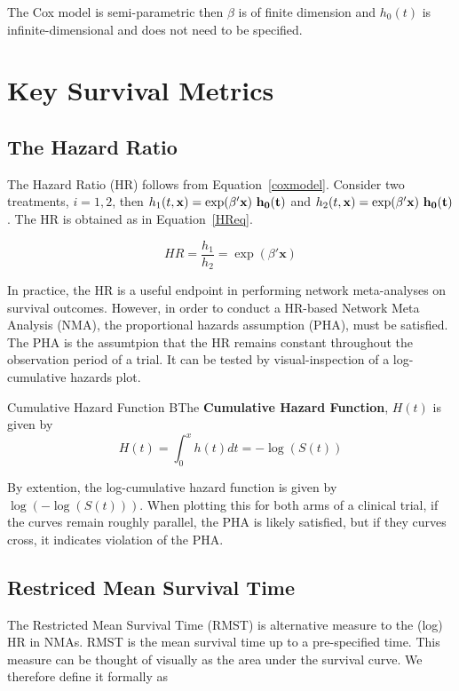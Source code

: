 The Cox model is semi-parametric then $\beta$ is of finite dimension and $h_0(t)$ is infinite-dimensional and does not need to be specified. 

\section{Key Survival Metrics}

\subsection{The Hazard Ratio}
The Hazard Ratio (HR) follows from Equation~\ref{coxmodel}. Consider two treatments, $i = 1, 2$, then $h_1(t, \bf{x}) = \exp(\beta'\textbf{x}) \ h_0(t)$ and $h_2(t, \bf{x}) = \exp(\beta'\textbf{x}) \ h_0(t)$. The HR is obtained as in Equation~\ref{HReq}.

\begin{equation}
    HR = \frac{h_1}{h_2} = \exp(\beta' \textbf{x})
    \label{HReq}
\end{equation}

In practice, the HR is a useful endpoint in performing network meta-analyses on survival outcomes. However, in order to conduct a HR-based Network Meta Analysis (NMA), the proportional hazards assumption (PHA), must be satisfied. The PHA is the assumtpion that the HR remains constant throughout the observation period of a trial. It can be tested by visual-inspection of a log-cumulative hazards plot. 

\begin{definition}{Cumulative Hazard Function}
    BThe \textbf{Cumulative Hazard Function}, $H(t)$ is given by 
    \[
        H(t) = \int_{0}^{x}h(t)dt = -\log(S(t))  
    \]
\end{definition}

By extention, the log-cumulative hazard function is given by $\log(-\log(S(t)))$. When plotting this for both arms of a clinical trial, if the curves remain roughly parallel, the PHA is likely satisfied, but if they curves cross, it indicates violation of the PHA.

\subsection{Restriced Mean Survival Time}
The Restricted Mean Survival Time (RMST) is alternative measure to the (log) HR in NMAs. RMST is the mean survival time up to a pre-specified time. This measure can be thought of visually as the area under the survival curve. We therefore define it formally as

